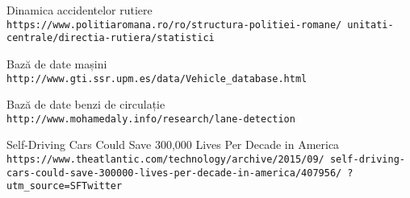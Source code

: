 \begin{thebibliography}{9}
	Dinamica accidentelor rutiere
	\\\texttt{https://www.politiaromana.ro/ro/structura-politiei-romane/
		unitati-centrale/directia-rutiera/statistici}
	
	Bază de date mașini
	\\\texttt{http://www.gti.ssr.upm.es/data/Vehicle\_database.html}
	
	Bază de date benzi de circulație
	\\\texttt{http://www.mohamedaly.info/research/lane-detection}
	
	Self-Driving Cars Could Save 300,000 Lives Per Decade in America
	\\\texttt{https://www.theatlantic.com/technology/archive/2015/09/
		self-driving-cars-could-save-300000-lives-per-decade-in-america/407956/
		?utm\_source=SFTwitter}
	
	
\end{thebibliography}